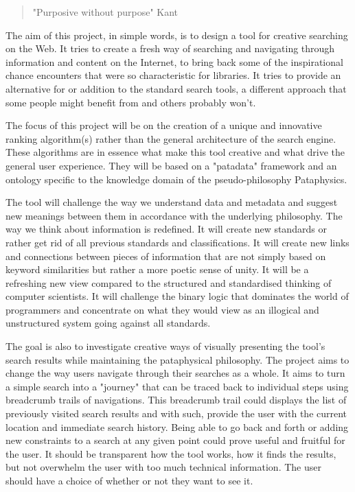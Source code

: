 \begin{quote}
  "Purposive without purpose" Kant
\end{quote}

The aim of this project, in simple words, is to design a tool for creative searching on the Web. It tries to create a fresh way of searching and navigating through information and content on the Internet, to bring back some of the inspirational chance encounters that were so characteristic for libraries. It tries to provide an alternative for or addition to the standard search tools, a different approach that some people might benefit from and others probably won't.

The focus of this project will be on the creation of a unique and innovative ranking algorithm(s) rather than the general architecture of the search engine. These algorithms are in essence what make this tool creative and what drive the general user experience. They will be based on a "patadata" framework and an ontology specific to the knowledge domain of the pseudo-philosophy Pataphysics.

The tool will challenge the way we understand data and metadata and suggest new meanings between them in accordance with the underlying philosophy. The way we think about information is redefined. It will create new standards or rather get rid of all previous standards and classifications. It will create new links and connections between pieces of information that are not simply based on keyword similarities but rather a more poetic sense of unity. It will be a refreshing new view compared to the structured and standardised thinking of computer scientists. It will challenge the binary logic that dominates the world of programmers and concentrate on what they would view as an illogical and unstructured system going against all standards.

The goal is also to investigate creative ways of visually presenting the tool's search results while maintaining the pataphysical philosophy. The project aims to change the way users navigate through their searches as a whole. It aims to turn a simple search into a "journey" that can be traced back to individual steps using breadcrumb trails of navigations. This breadcrumb trail could displays the list of previously visited search results and with such, provide the user with the current location and immediate search history. Being able to go back and forth or adding new constraints to a search at any given point could prove useful and fruitful for the user. It should be transparent how the tool works, how it finds the results, but not overwhelm the user with too much technical information. The user should have a choice of whether or not they want to see it.

